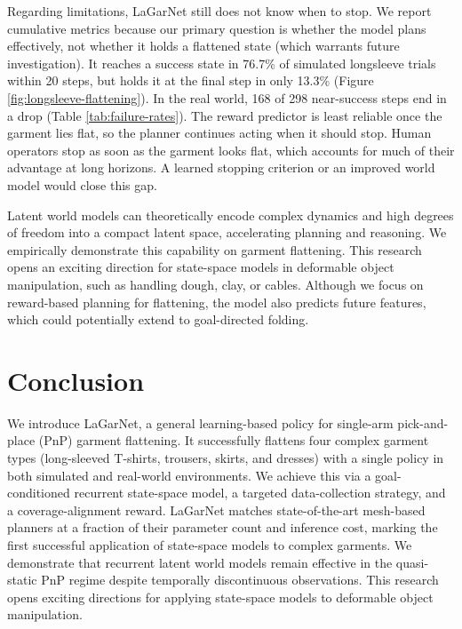 \documentclass[journal]{IEEEtran}
\newif\ifshowrev\showrevtrue
\newcommand{\rev}[1]{\ifshowrev\textcolor{revblue}{#1}\else#1\fi}
\begin{document}
\rev{Regarding limitations, LaGarNet still does not know when to stop. We report cumulative metrics because our primary question is whether the model plans effectively, not whether it holds a flattened state (which warrants future investigation). It reaches a success state in 76.7\% of simulated longsleeve trials within 20 steps, but holds it at the final step in only 13.3\% (Figure \ref{fig:longsleeve-flattening}). In the real world, 168 of 298 near-success steps end in a drop (Table \ref{tab:failure-rates}). The reward predictor is least reliable once the garment lies flat, so the planner continues acting when it should stop. Human operators stop as soon as the garment looks flat, which accounts for much of their advantage at long horizons. A learned stopping criterion or an improved world model would close this gap.}

\rev{Latent world models can theoretically encode complex dynamics and high degrees of freedom into a compact latent space, accelerating planning and reasoning. We empirically demonstrate this capability on garment flattening. This research opens an exciting direction for state-space models in deformable object manipulation, such as handling dough, clay, or cables. Although we focus on reward-based planning for flattening, the model also predicts future features, which could potentially extend to goal-directed folding.}


\section{Conclusion} \label{sec:conclusion}

We introduce LaGarNet, a general learning-based policy for single-arm pick-and-place (PnP) garment flattening. It successfully flattens four complex garment types (long-sleeved T-shirts, trousers, skirts, and dresses) with a single policy in both simulated and real-world environments. We achieve this via a goal-conditioned recurrent state-space model, a targeted data-collection strategy, and a coverage-alignment reward. \rev{LaGarNet matches state-of-the-art mesh-based planners at a fraction of their parameter count and inference cost, marking the first successful application of state-space models to complex garments. We demonstrate that recurrent latent world models remain effective in the quasi-static PnP regime despite temporally discontinuous observations.} This research opens exciting directions for applying state-space models to deformable object manipulation.
\end{document}
